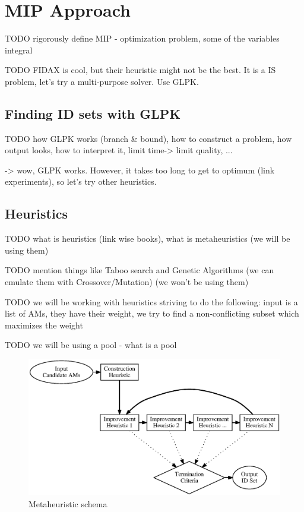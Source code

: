 \chapter{MIP Approach}

TODO rigorously define MIP - optimization problem, some of the variables integral

TODO FIDAX is cool, but their heuristic might not be the best. It is a IS problem, let's try a multi-purpose solver. Use GLPK. 

\section{Finding ID sets with GLPK}

TODO how GLPK works (branch \& bound), how to construct a problem, how output looks, how to interpret it, limit time-> limit quality, ...

 -> wow, GLPK works. However, it takes too long to get to optimum (link experiments), so let's try other heuristics.

\section{Heuristics}

TODO what is heuristics (link wise books), what is metaheuristics (we will be using them)

TODO mention things like Taboo search and Genetic Algorithms (we can emulate them with Crossover/Mutation) (we won't be using them)

TODO we will be working with heuristics striving to do the following: input is a list of AMs, they have their weight, we try to find a non-conflicting subset which maximizes the weight

TODO we will be using a pool - what is a pool

\begin{figure}
  \caption{Metaheuristic schema}
  \label{image-metaheuristic}
  \centering
    \includegraphics[width=\textwidth]{images/metaheuristic}
\end{figure}

